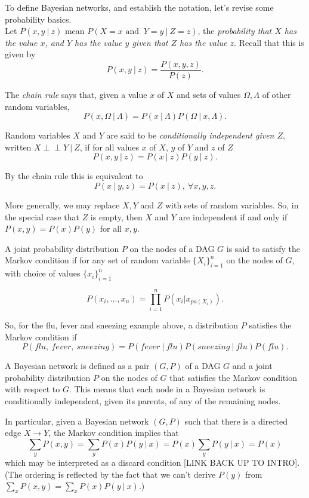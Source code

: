 \documentclass[11pt, oneside]{article}   	%
\def\ci{\perp\!\!\!\perp}
\begin{document}
To define Bayesian networks, and establish the notation, let's revise some probability basics.
\\
Let $P(x,y \ | \ z)$ mean $P(X = x \text{ and } \ Y = y \ | \ Z = z)$, the \emph{probability that $X$ has the value $x$, and $Y$ has the value $y$ given that $Z$ has the value $z$}. Recall that this is given by
\[ P(x,y \ |\ z) = \frac{ P(x,y,z) }{P(z)}.\]

The \emph{chain rule} says that, given a value $x$ of $X$ and sets of values $\Omega, \Lambda$ of other random variables, 
\[ P(x, \Omega \ | \ \Lambda) = P( x \ | \ \Lambda) P( \Omega \ | \ x, \Lambda).\]

Random variables $X$ and $Y$ are said to be \emph{conditionally independent given $Z$}, written $X \ci Y \ | \ Z$, if for all values $x$ of $X$, $y$ of $Y$ and $z$ of $Z$
\[ P(x,y \ | \ z) = P(x \ | \ z) P(y \ | \ z).\]

By the chain rule this is equivalent to 
\[ P(x \ | \ y,z )  = P (x \ | \ z) , \ \forall x,y, z. \]

More generally, we may replace $X,Y$ and $Z$ with sets of random variables. So, in the special case that $Z$ is empty, then $X$ and $Y$ are independent if and only if $ P(x, y) = P(x)P(y)$ for all $x,y$.




A joint probability distribution $P$ on the nodes of a DAG $ G$ is said to satisfy the Markov condition if for any set of random variable $\{X_i\}_{i = 1}^n$ on the nodes of $G$, with choice of values $\{x_i\}_{i = 1}^n$

\[P(x_i, \dots, x_n) = \prod_{i = 1}^n P(x_i|x_{pa(X_i)}).\]

So, for the flu, fever and sneezing example above, a distribution $P$ satisfies the Markov condition if
\[ P(flu, \ fever, \ sneezing)  = P(fever \ | \ flu) P(sneezing \ | \ flu) P(flu).\]

A Bayesian network is defined as a pair $(G,P)$ of a DAG $G$ and a joint probability distribution $P$ on the nodes of $G$ that satisfies the Markov condition with respect to $G$. This means that each node in a Bayesian network is conditionally independent, given its parents, of any of the remaining nodes.

In particular, given a Bayesian network $(G,P)$ such that there is a directed edge $X \to Y$, the Markov condition implies that 
\[ \sum_{y} P(x,y) = \sum_y P(x) P(y \ | \ x) = P(x) \sum_y P(y \ | \ x)  = P(x)\] which may be interpreted as a discard condition [LINK BACK UP TO INTRO]. (The ordering is reflected by the fact that we can't derive $P(y)$ from $ \sum_{x} P(x,y) = \sum_x P(x) P(y \ | \ x) $.)
\end{document}
